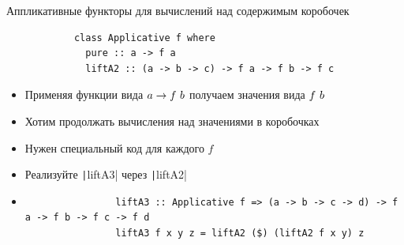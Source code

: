     \begin{frame}[fragile]{Аппликативные функторы для вычислений над содержимым коробочек}
        \begin{verbatim}
            class Applicative f where
              pure :: a -> f a
              liftA2 :: (a -> b -> c) -> f a -> f b -> f c
        \end{verbatim}
        \vspace{0.5em}
        \begin{itemize}
            \item Применяя функции вида $a \to f ~ b$ получаем значения вида $f ~ b$
            \item Хотим продолжать вычисления над значениями в коробочках
            \item Нужен специальный код для каждого $f$
            \item[\todo] Реализуйте \texttt|liftA3| через \texttt|liftA2|
            \item[\answer] \pause
            \begin{verbatim}
                liftA3 :: Applicative f => (a -> b -> c -> d) -> f a -> f b -> f c -> f d
                liftA3 f x y z = liftA2 ($) (liftA2 f x y) z
            \end{verbatim}
        \end{itemize}
    \end{frame}

